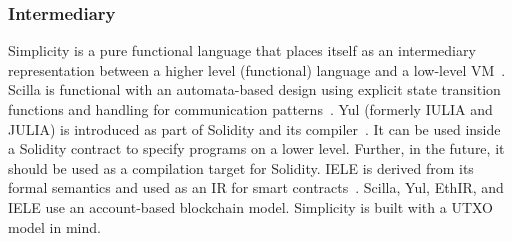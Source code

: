 \subsubsection{Intermediary}
Simplicity is a pure functional language that places itself as an intermediary representation between a higher level (functional) language and a low-level VM~\cite{OConnor2017}. 
Scilla is functional with an automata-based design using explicit state transition functions and handling for communication patterns~\cite{Sergey2018}. 
Yul (formerly IULIA and JULIA) is introduced as part of Solidity and its compiler~\cite{EthereumFoundation2018IULIA}. 
It can be used inside a Solidity contract to specify programs on a lower level. Further, in the future, it should be used as a compilation target for Solidity.
IELE is derived from its formal semantics and used as an IR for smart contracts~\cite{Kasampalis2018}. 
Scilla, Yul, EthIR, and IELE use an account-based blockchain model. Simplicity is built with a UTXO model in mind.

